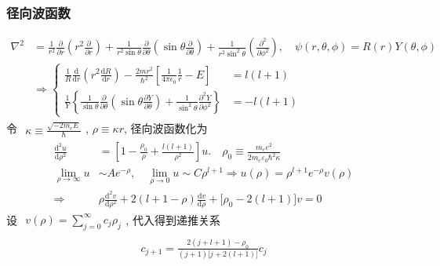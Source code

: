 \documentclass[../../main.tex]{subfiles}
\begin{document}
\subsubsection{径向波函数}
\begin{align*}
    \nabla^{2}&=\frac{1}{r^{2}}\frac{\partial}{\partial r}\left(r^{2}\frac{\partial}{\partial r}\right) + \frac{1}{r^{2}\sin{\theta}}\frac{\partial}{\partial\theta}\left(\sin{\theta}\frac{\partial}{\partial\theta}\right) + \frac{1}{r^{2}\sin^{2}{\theta}}\left(\frac{\partial^{2}}{\partial\phi^{2}}\right),\quad\psi(r,\theta,\phi) = R(r)Y(\theta,\phi)\\
    &\Rightarrow \left\{\begin{aligned}
        \frac{1}{R}\frac{\mathrm{d}}{\mathrm{d}r}\left(r^{2}\frac{\mathrm{d}R}{\mathrm{d}r}\right) - \frac{2mr^{2}}{\hbar^{2}}\left[\frac{1}{4\pi\epsilon_{0}}\frac{1}{r} - E\right] &= l(l+1)\\
        \frac{1}{Y}\left\{\frac{1}{\sin{\theta}}\frac{\partial}{\partial\theta}\left(\sin{\theta}\frac{\partial Y}{\partial\theta}\right) + \frac{1}{\sin^{2}{\theta}}\frac{\partial^{2}Y}{\partial\phi^{2}}\right\}&=-l(l+1)
    \end{aligned}\right.
\end{align*}
令 $\begin{aligned}
    \kappa\equiv \frac{\sqrt{-2m_{e}E}}{\hbar}
\end{aligned}$, $\rho\equiv \kappa r$, 径向波函数化为
\begin{align*}
    \frac{\mathrm{d}^{2}u}{\mathrm{d}\rho^{2}} &= \left[1 - \frac{\rho_{0}}{\rho} + \frac{l(l+1)}{\rho^{2}}\right]u.\quad \rho_{0} \equiv \frac{m_{e}e^{2}}{2m_{e}\varepsilon_{0}\hbar^{2}\kappa}\\
    \lim_{\rho\rightarrow\infty}u&\sim Ae^{-\rho},\quad \lim_{\rho\rightarrow 0}u\sim C\rho^{l+1}\Rightarrow u(\rho) = \rho^{l+1}e^{-\rho}v(\rho)\\
    \Rightarrow& \rho\frac{\mathrm{d}^{2}v}{\mathrm{d}\rho^{2}} + 2(l+1-\rho)\frac{\mathrm{d}v}{\mathrm{d}\rho} + \bigg[\rho_{0} - 2(l+1)\bigg]v = 0
\end{align*}
设 $\begin{aligned}
    v(\rho) = \sum_{j=0}^{\infty}c_{j}\rho_{j}
\end{aligned}$, 代入得到递推关系
\begin{align*}
    \begin{aligned}
        c_{j+1} = \frac{2(j+l+1)-\rho_{0}}{(j+1)\bigg[j+2(l+1)\bigg]}c_{j}
    \end{aligned}
\end{align*}
\end{document}
